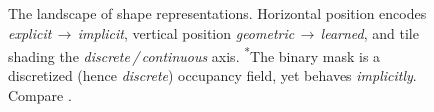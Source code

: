 





\begin{figure}[htbp]
    \centering
    \begin{scaletikzpicturetowidth}{\textwidth}
    
    \end{scaletikzpicturetowidth}
    \caption[Shape representation landscape]{The landscape of shape representations. Horizontal
    position encodes \emph{explicit\,$\rightarrow$\,implicit}, vertical position
    \emph{geometric\,$\rightarrow$\,learned}, and tile shading the \emph{discrete\,/\,continuous}
    axis. \textsuperscript{*}The binary mask is a discretized (hence \emph{discrete}) occupancy
    field, yet behaves \emph{implicitly}. Compare .}
    \label{fig:shape-landscape}
\end{figure}
